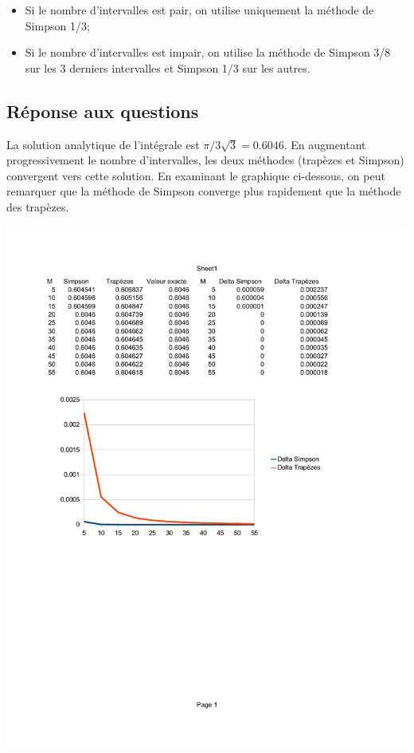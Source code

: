\documentclass[10pt]{article}
\begin{document}
\begin{itemize}
\item Si le nombre d'intervalles est pair, on utilise uniquement la
  méthode de Simpson 1/3;
\item Si le nombre d'intervalles est impair, on utilise la méthode de
  Simpson 3/8 sur les 3 derniers intervalles et Simpson 1/3 sur les autres.
\end{itemize}

\subsection{Réponse aux questions}

La solution analytique de l'intégrale est $\pi/3\sqrt{3} = 0.6046$.  En
augmentant progressivement le nombre d'intervalles, les deux méthodes
(trapèzes et Simpson) convergent vers cette solution.  En examinant le
graphique ci-dessous, on peut remarquer que la méthode de Simpson
converge plus rapidement que la méthode des trapèzes.

\includegraphics[scale=0.8]{delta.pdf}
\end{document}
